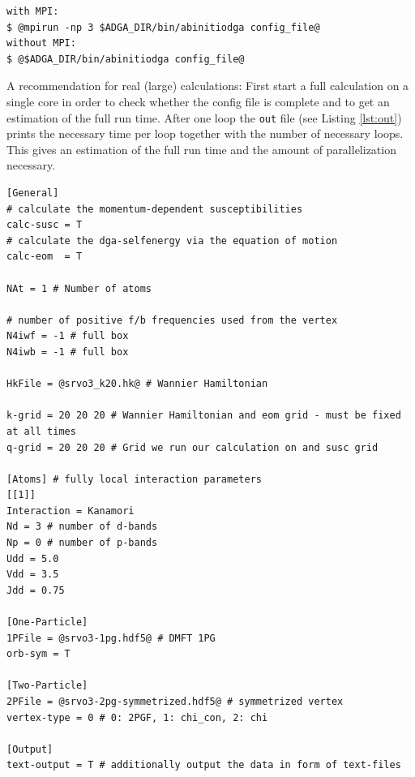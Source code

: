 \documentclass[a4paper,11pt]{article}
\numberwithin{equation}{section} %
\begin{document}
\begin{lstlisting}[caption=abinitiodga run commands, frame=single, basicstyle=\small, style=base]
with MPI:
$ @mpirun -np 3 $ADGA_DIR/bin/abinitiodga config_file@
without MPI:
$ @$ADGA_DIR/bin/abinitiodga config_file@
\end{lstlisting}

A recommendation for real (large) calculations: First start a full calculation on a single core
in order to check whether the config file is complete and to get an estimation of the full run time.
After one loop the \verb+out+ file (see Listing \ref{lst:out}) prints the necessary time per loop together with the number of necessary loops. This gives an estimation of the full run time and the amount of parallelization necessary.

\newpage
\begin{lstlisting}[caption=config file for q-grid calculation, frame=single, basicstyle=\small, style=base2, label={lst:configqgrid}]
[General]
# calculate the momentum-dependent susceptibilities
calc-susc = T
# calculate the dga-selfenergy via the equation of motion
calc-eom  = T

NAt = 1 # Number of atoms

# number of positive f/b frequencies used from the vertex
N4iwf = -1 # full box
N4iwb = -1 # full box

HkFile = @srvo3_k20.hk@ # Wannier Hamiltonian

k-grid = 20 20 20 # Wannier Hamiltonian and eom grid - must be fixed at all times
q-grid = 20 20 20 # Grid we run our calculation on and susc grid

[Atoms] # fully local interaction parameters
[[1]]
Interaction = Kanamori
Nd = 3 # number of d-bands
Np = 0 # number of p-bands
Udd = 5.0
Vdd = 3.5
Jdd = 0.75

[One-Particle]
1PFile = @srvo3-1pg.hdf5@ # DMFT 1PG
orb-sym = T

[Two-Particle]
2PFile = @srvo3-2pg-symmetrized.hdf5@ # symmetrized vertex
vertex-type = 0 # 0: 2PGF, 1: chi_con, 2: chi

[Output]
text-output = T # additionally output the data in form of text-files
\end{lstlisting}
\end{document}
